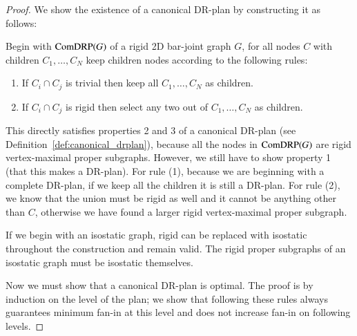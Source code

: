 \begin{proof}
We show the existence of a canonical DR-plan by constructing it as follows:

Begin with $\text{ComDRP}(G)$ of a rigid 2D bar-joint graph $G$, for all nodes $C$ with children $C_1,\ldots,C_N$ keep children nodes according to the following rules:
\begin{enumerate}
   \item If $C_i \cap C_j$ is trivial then keep all $C_1,\ldots,C_N$ as children.
   \item If $C_i \cap C_j$ is rigid then select any two out of $C_1,\ldots,C_N$ as children.
\end{enumerate}

This directly satisfies properties 2 and 3 of a canonical DR-plan (see Definition~\ref{def:canonical_drplan}), because all the nodes in $\text{ComDRP}(G)$ are rigid vertex-maximal proper subgraphs. However, we still have to show property 1 (that this makes a DR-plan).
For rule (1), because we are beginning with a complete DR-plan, if we keep all the children it is still a DR-plan. For rule (2), we know that the union must be rigid as well and it cannot be anything other than $C$, otherwise we have found a larger rigid vertex-maximal proper subgraph.

If we begin with an isostatic graph, rigid can be replaced with isostatic throughout the construction and remain valid. The rigid proper subgraphs of an isostatic graph must be isostatic themselves.

Now we must show that a canonical DR-plan is optimal. The proof is by induction on the level of the plan; we show that following these rules always guarantees minimum fan-in at this level and does not increase fan-in on following levels.









\end{proof}
